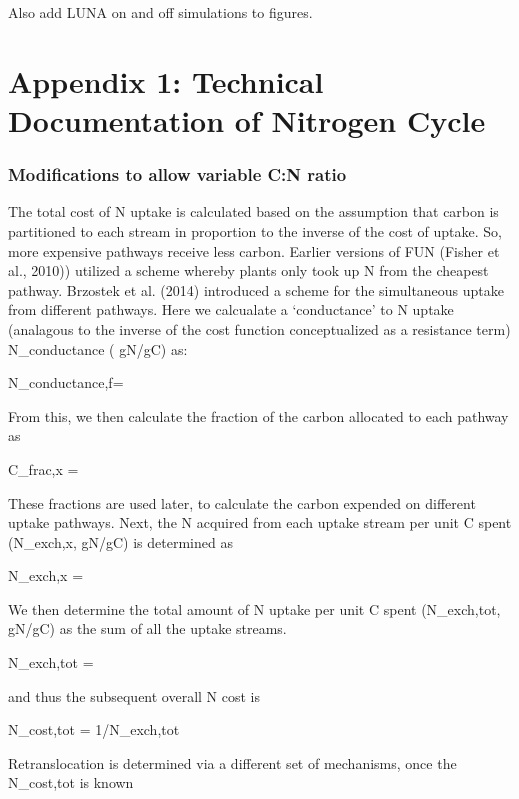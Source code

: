 \documentclass[draft,linenumbers]{agujournal}
\begin{document}
Also add LUNA on and off simulations to figures. 



\nocite{*} 



\section{Appendix 1: Technical Documentation of Nitrogen Cycle}
\subsubsection{Modifications to allow variable C:N ratio}
The total cost of N uptake is calculated based on the assumption that carbon is partitioned to each stream in proportion to the inverse of the cost of uptake. So, more expensive pathways receive less carbon. Earlier versions of FUN (Fisher et al., 2010)) utilized a scheme whereby plants only took up N from the cheapest pathway. Brzostek et al. (2014) introduced a scheme for the simultaneous uptake from different pathways. Here we calcualate a ‘conductance’ to N uptake (analagous to the inverse of the cost function conceptualized as a resistance term) N_{conductance} ( gN/gC) as:

N_{conductance,f}=  

From this, we then calculate the fraction of the carbon allocated to each pathway as

C_{frac,x} = 

These fractions are used later, to calculate the carbon expended on different uptake pathways. Next, the N acquired from each uptake stream per unit C spent (N_{exch,x}, gN/gC) is determined as

N_{exch,x} = 

We then determine the total amount of N uptake per unit C spent (N_{exch,tot}, gN/gC) as the sum of all the uptake streams.

N_{exch,tot} = 

and thus the subsequent overall N cost is

N_{cost,tot} = 1/{N_{exch,tot}}

Retranslocation is determined via a different set of mechanisms, once the N_{cost,tot} is known
\end{document}

